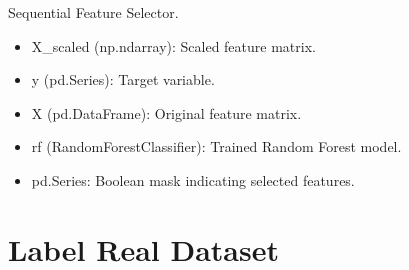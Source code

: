 \documentclass[letterpaper,10pt,english]{sphinxmanual}
\begin{document}
\begin{fulllineitems}
\label{\detokenize{eda:eda.sfs_selection}}
\pysigstartsignatures
{}
\pysigstopsignatures
\sphinxAtStartPar
Sequential Feature Selector.
\begin{description}
\begin{itemize}
\item {} 
\sphinxAtStartPar
X\_scaled (np.ndarray): Scaled feature matrix.

\item {} 
\sphinxAtStartPar
y (pd.Series): Target variable.

\item {} 
\sphinxAtStartPar
X (pd.DataFrame): Original feature matrix.

\item {} 
\sphinxAtStartPar
rf (RandomForestClassifier): Trained Random Forest model.

\end{itemize}

\begin{itemize}
\item {} 
\sphinxAtStartPar
pd.Series: Boolean mask indicating selected features.

\end{itemize}

\end{description}

\end{fulllineitems}


\sphinxstepscope


\chapter{Label Real Dataset}
\label{\detokenize{add_current_uc:module-add_current_uc}}\label{\detokenize{add_current_uc:label-real-dataset}}\label{\detokenize{add_current_uc::doc}}
\end{document}
